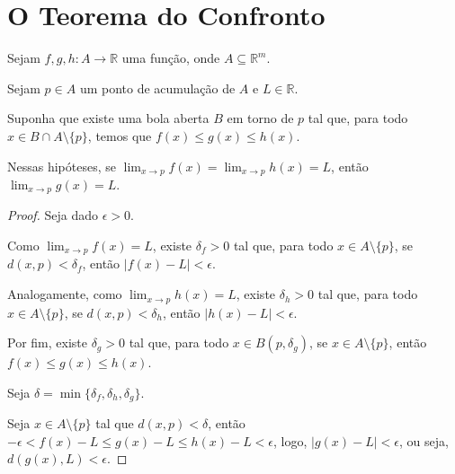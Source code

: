 \section{O Teorema do Confronto}

\begin{proposition}
    Sejam $f, g, h: A \to \mathbb R$ uma função, onde $A\subseteq \mathbb R^m$.

    Sejam $p \in A$ um ponto de acumulação de $A$ e $L \in \mathbb R$.

    Suponha que existe uma bola aberta $B$ em torno de $p$ tal que, para todo $x \in B\cap A\setminus\{p\}$, temos que $f(x) \leq g(x) \leq h(x)$.

    Nessas hipóteses, se $\lim_{x\to p} f(x) = \lim_{x\to p} h(x) = L$, então $\lim_{x\to p} g(x) = L$.
\end{proposition}

\begin{proof}
    Seja dado $\epsilon > 0$.
    
    Como $\lim_{x\to p} f(x) = L$, existe $\delta_f>0$ tal que, para todo $x \in A\setminus\{p\}$, se $d(x, p) < \delta_f$, então $|f(x) - L| < \epsilon$.

    Analogamente, como $\lim_{x\to p} h(x) = L$, existe $\delta_h>0$ tal que, para todo $x \in A\setminus\{p\}$, se $d(x, p) < \delta_h$, então $|h(x) - L| < \epsilon$.

    Por fim, existe $\delta_g>0$ tal que, para todo $x \in B(p, \delta_g)$, se $x \in A\setminus\{p\}$, então $f(x) \leq g(x) \leq h(x)$.

    Seja $\delta = \min\{\delta_f, \delta_h, \delta_g\}$.

    Seja $x \in A\setminus\{p\}$ tal que $d(x, p) < \delta$, então $-\epsilon<f(x) - L \leq g(x) - L \leq h(x) - L < \epsilon$, logo, $|g(x) - L| < \epsilon$, ou seja, $d(g(x), L) < \epsilon$.
\end{proof}